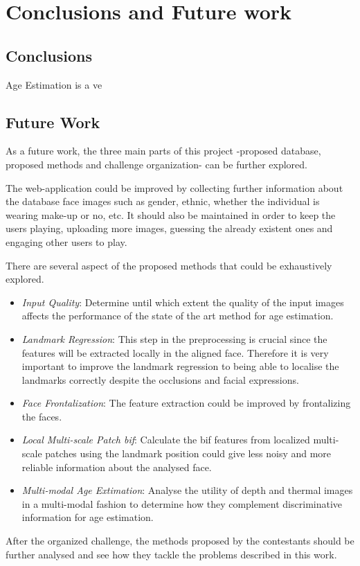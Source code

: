 \chapter{Conclusions and Future work} \label{chap:conclusions}

\section{Conclusions}


Age Estimation is a ve

\section{Future Work}

As a future work, the three main parts of this project -proposed database, proposed methods and challenge organization- can be further explored.

The web-application could be improved by collecting further information about the database face images such as gender, ethnic, whether the individual is wearing make-up or no, etc. It should also be maintained in order to keep the users playing, uploading more images, guessing the already existent ones and engaging other users to play.

There are several aspect of the proposed methods that could be exhaustively explored.

\begin{itemize}
	\item \textit{Input Quality}: Determine until which extent the quality of the input images affects the performance of the state of the art method for age estimation.
	
	\item \textit{Landmark Regression}: This step in the preprocessing is crucial since the features will be extracted locally in the aligned face. Therefore it is very important to improve the landmark regression to being able to localise the landmarks correctly despite the occlusions and facial expressions.
	
	\item \textit{Face Frontalization}: The feature extraction could be improved by frontalizing the faces.
	
	\item \textit{Local Multi-scale Patch \gls{bif}}: Calculate the \gls{bif} features from localized multi-scale patches using the landmark position could give less noisy and more reliable information about the analysed face.
	
	\item \textit{Multi-modal Age Extimation}: Analyse the utility of depth and thermal images in a multi-modal fashion to determine how they complement discriminative information for age estimation.
\end{itemize}

After the organized challenge, the methods proposed by the contestants should be further analysed and see how they tackle the problems described in this work.


